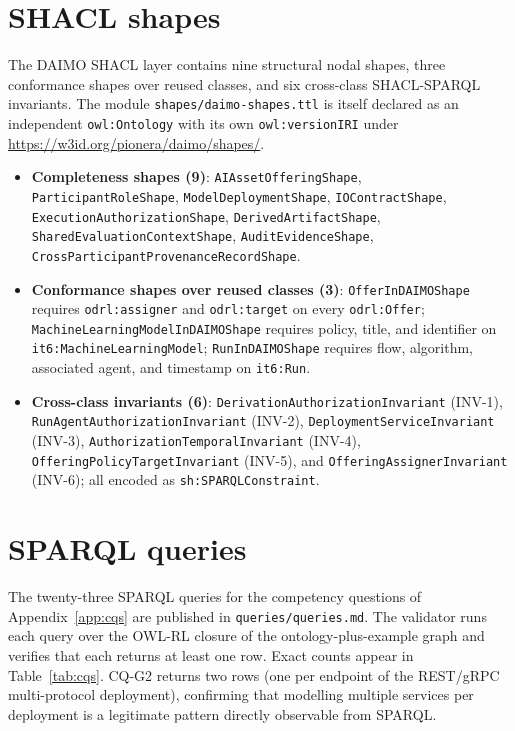 \documentclass[Afour,sagev,times]{sagej}
\newcommand{\code}[1]{\texttt{#1}}
\begin{document}
\section{SHACL shapes}\label{app:shapes}

The DAIMO SHACL layer contains nine structural nodal shapes, three conformance shapes over reused classes, and six cross-class SHACL-SPARQL invariants. The module \code{shapes/daimo-shapes.ttl} is itself declared as an independent \code{owl:Ontology} with its own \code{owl:versionIRI} under \url{https://w3id.org/pionera/daimo/shapes/}.

\begin{itemize}[leftmargin=*]
\item \textbf{Completeness shapes (9)}: \code{AIAssetOfferingShape}, \code{ParticipantRoleShape}, \code{ModelDeploymentShape}, \code{IOContractShape}, \code{ExecutionAuthorizationShape}, \code{DerivedArtifactShape}, \code{SharedEvaluationContextShape}, \code{AuditEvidenceShape}, \code{CrossParticipantProvenanceRecordShape}.
\item \textbf{Conformance shapes over reused classes (3)}: \code{OfferInDAIMOShape} requires \code{odrl:assigner} and \code{odrl:target} on every \code{odrl:Offer}; \code{MachineLearningModelInDAIMOShape} requires policy, title, and identifier on \code{it6:MachineLearningModel}; \code{RunInDAIMOShape} requires flow, algorithm, associated agent, and timestamp on \code{it6:Run}.
\item \textbf{Cross-class invariants (6)}: \code{DerivationAuthorizationInvariant} (INV-1), \code{RunAgentAuthorizationInvariant} (INV-2), \code{DeploymentServiceInvariant} (INV-3), \code{AuthorizationTemporalInvariant} (INV-4), \code{OfferingPolicyTargetInvariant} (INV-5), and \code{OfferingAssignerInvariant} (INV-6); all encoded as \code{sh:SPARQLConstraint}.
\end{itemize}

\section{SPARQL queries}\label{app:sparql}

The twenty-three SPARQL queries for the competency questions of Appendix~\ref{app:cqs} are published in \code{queries/queries.md}. The validator runs each query over the OWL-RL closure of the ontology-plus-example graph and verifies that each returns at least one row. Exact counts appear in Table~\ref{tab:cqs}. CQ-G2 returns two rows (one per endpoint of the REST/gRPC multi-protocol deployment), confirming that modelling multiple services per deployment is a legitimate pattern directly observable from SPARQL.
\end{document}
